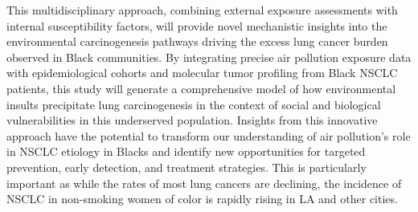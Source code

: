 This multidisciplinary approach, combining external exposure assessments with internal susceptibility factors, 
will provide novel mechanistic insights into the environmental carcinogenesis pathways driving the excess lung cancer burden observed in Black communities. 
By integrating precise air pollution exposure data with epidemiological cohorts and molecular tumor profiling from Black NSCLC patients, 
this study will generate a comprehensive model of how environmental insults precipitate lung carcinogenesis 
in the context of social and biological vulnerabilities in this underserved population. 
Insights from this innovative approach have the potential to transform our understanding of air pollution's role in NSCLC etiology in Blacks 
and identify new opportunities for targeted prevention, early detection, and treatment strategies.
This is particularly important as while the rates of most lung cancers are declining, 
the incidence of NSCLC in non-smoking women of color is rapidly rising in LA and other cities.%

